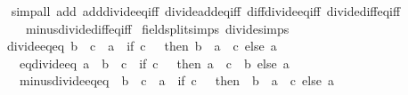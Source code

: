 \begin{isabellebody}
%
\isadelimproof
\ \ %
\endisadelimproof
%
\isatagproof
{}\isamarkupfalse%
\ {\isacharparenleft}{\kern0pt}simp{\isacharunderscore}{\kern0pt}all\ add{\isacharcolon}{\kern0pt}\ add{\isacharunderscore}{\kern0pt}divide{\isacharunderscore}{\kern0pt}eq{\isacharunderscore}{\kern0pt}iff\ divide{\isacharunderscore}{\kern0pt}add{\isacharunderscore}{\kern0pt}eq{\isacharunderscore}{\kern0pt}iff\ diff{\isacharunderscore}{\kern0pt}divide{\isacharunderscore}{\kern0pt}eq{\isacharunderscore}{\kern0pt}iff\ divide{\isacharunderscore}{\kern0pt}diff{\isacharunderscore}{\kern0pt}eq{\isacharunderscore}{\kern0pt}iff\isanewline
\ \ \ \ \ \ minus{\isacharunderscore}{\kern0pt}divide{\isacharunderscore}{\kern0pt}diff{\isacharunderscore}{\kern0pt}eq{\isacharunderscore}{\kern0pt}iff{\isacharparenright}{\kern0pt}%
\endisatagproof
{\isafoldproof}%
%
\isadelimproof
\isanewline
%
\endisadelimproof
\isanewline
{}\isamarkupfalse%
\ {\isacharbrackleft}{\kern0pt}field{\isacharunderscore}{\kern0pt}split{\isacharunderscore}{\kern0pt}simps{\isacharcomma}{\kern0pt}\ divide{\isacharunderscore}{\kern0pt}simps{\isacharbrackright}{\kern0pt}{\isacharcolon}{\kern0pt}\isanewline
\ \ \ divide{\isacharunderscore}{\kern0pt}eq{\isacharunderscore}{\kern0pt}eq{\isacharcolon}{\kern0pt}\ {\isachardoublequoteopen}b\ {\isacharslash}{\kern0pt}\ c\ {\isacharequal}{\kern0pt}\ a\ {\isasymlongleftrightarrow}\ {\isacharparenleft}{\kern0pt}if\ c\ {\isasymnoteq}\ {}\ then\ b\ {\isacharequal}{\kern0pt}\ a\ {\isacharasterisk}{\kern0pt}\ c\ else\ a\ {\isacharequal}{\kern0pt}\ {}{\isacharparenright}{\kern0pt}{\isachardoublequoteclose}\isanewline
\ \ \ \ \ eq{\isacharunderscore}{\kern0pt}divide{\isacharunderscore}{\kern0pt}eq{\isacharcolon}{\kern0pt}\ {\isachardoublequoteopen}a\ {\isacharequal}{\kern0pt}\ b\ {\isacharslash}{\kern0pt}\ c\ {\isasymlongleftrightarrow}\ {\isacharparenleft}{\kern0pt}if\ c\ {\isasymnoteq}\ {}\ then\ a\ {\isacharasterisk}{\kern0pt}\ c\ {\isacharequal}{\kern0pt}\ b\ else\ a\ {\isacharequal}{\kern0pt}\ {}{\isacharparenright}{\kern0pt}{\isachardoublequoteclose}\isanewline
\ \ \ \ \ minus{\isacharunderscore}{\kern0pt}divide{\isacharunderscore}{\kern0pt}eq{\isacharunderscore}{\kern0pt}eq{\isacharcolon}{\kern0pt}\ {\isachardoublequoteopen}{\isacharminus}{\kern0pt}\ {\isacharparenleft}{\kern0pt}b\ {\isacharslash}{\kern0pt}\ c{\isacharparenright}{\kern0pt}\ {\isacharequal}{\kern0pt}\ a\ {\isasymlongleftrightarrow}\ {\isacharparenleft}{\kern0pt}if\ c\ {\isasymnoteq}\ {}\ then\ {\isacharminus}{\kern0pt}\ b\ {\isacharequal}{\kern0pt}\ a\ {\isacharasterisk}{\kern0pt}\ c\ else\ a\ {\isacharequal}{\kern0pt}\ {}{\isacharparenright}{\kern0pt}{\isachardoublequoteclose}\isanewline

\end{isabellebody}
